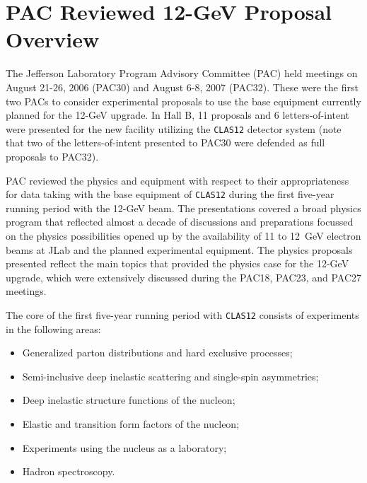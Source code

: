\chapter{PAC Reviewed 12-GeV Proposal Overview}

The Jefferson Laboratory Program Advisory Committee (PAC) held  
meetings on August 21-26, 2006 (PAC30) and August 6-8, 2007 (PAC32).
These were the first two PACs to consider experimental proposals to 
use the base equipment currently planned for the 12-GeV upgrade.  In 
Hall B, 11 proposals and 6 letters-of-intent were presented for the 
new facility utilizing the {\tt CLAS12} detector system (note that
two of the letters-of-intent presented to PAC30 were defended as full
proposals to PAC32).

PAC reviewed the physics and equipment with respect to their
appropriateness for data taking with the base equipment of {\tt CLAS12}
during the first five-year running period with the 12-GeV beam.  The 
presentations covered a broad physics program that reflected almost a 
decade of discussions and preparations focussed on the physics 
possibilities opened up by the availability of 11 to 12~GeV electron 
beams at JLab and the planned experimental equipment.  The physics proposals 
presented reflect the main topics that provided the physics case for the 
12-GeV upgrade, which were extensively discussed during the PAC18, PAC23, 
and PAC27 meetings.

The core of the first five-year running period with {\tt CLAS12}
consists of experiments in the following areas:

\begin{itemize}

\item Generalized parton distributions and hard exclusive processes;

\item Semi-inclusive deep inelastic scattering and single-spin asymmetries;

\item Deep inelastic structure functions of the nucleon;

\item Elastic and transition form factors of the nucleon;

\item Experiments using the nucleus as a laboratory;

\item Hadron spectroscopy.

\end{itemize}

